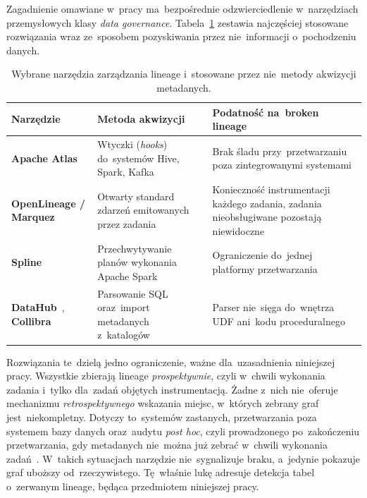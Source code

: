 \documentclass[polish,master,a4paper,oneside]{ppfcmthesis}
\renewcommand{\_}{\origtextunderscore\ifmmode\else\allowbreak\fi}
\begin{document}
Zagadnienie omawiane w~pracy ma~bezpośrednie odzwierciedlenie w~narzędziach
przemysłowych klasy \emph{data governance}. Tabela~\ref{tab:narzedzia}
zestawia najczęściej stosowane rozwiązania wraz ze~sposobem pozyskiwania
przez nie~informacji o~pochodzeniu danych.

\begin{table}[ht]
\centering
\caption[Wybrane narzędzia zarządzania lineage]{Wybrane narzędzia zarządzania lineage i~stosowane przez nie~metody
akwizycji metadanych.}
\label{tab:narzedzia}
\small
\begin{tabular}{@{}>{\raggedright\arraybackslash}p{3.6cm}
                >{\raggedright\arraybackslash}p{4.4cm}
                >{\raggedright\arraybackslash}p{4.6cm}@{}}
\toprule
\textbf{Narzędzie} & \textbf{Metoda akwizycji} & \textbf{Podatność
na~broken lineage} \\
\midrule
\textbf{Apache Atlas}~\cite{ApacheAtlas} &
  Wtyczki (\emph{hooks}) do~systemów Hive, Spark, Kafka &
  Brak śladu przy~przetwarzaniu poza zintegrowanymi systemami \\
\addlinespace[4pt]
\textbf{OpenLineage / Marquez}~\cite{OpenLineage} &
  Otwarty standard zdarzeń emitowanych przez zadania &
  Konieczność instrumentacji każdego zadania, zadania nieobsługiwane
  pozostają niewidoczne \\
\addlinespace[4pt]
\textbf{Spline}~\cite{Spline} &
  Przechwytywanie planów wykonania Apache Spark &
  Ograniczenie do~jednej platformy przetwarzania \\
\addlinespace[4pt]
\textbf{DataHub}~\cite{DataHub}, \textbf{Collibra}~\cite{Collibra} &
  Parsowanie SQL oraz~import metadanych z~katalogów &
  Parser nie~sięga do~wnętrza UDF ani~kodu proceduralnego \\
\bottomrule
\end{tabular}
\end{table}

Rozwiązania te~dzielą jedno ograniczenie, ważne dla~uzasadnienia niniejszej
pracy. Wszystkie zbierają lineage \emph{prospektywnie}, czyli w~chwili wykonania
zadania i~tylko dla~zadań objętych instrumentacją. Żadne z~nich nie~oferuje
mechanizmu \emph{retrospektywnego} wskazania miejsc, w~których zebrany graf
jest~niekompletny. Dotyczy to~systemów zastanych, przetwarzania poza systemem
bazy danych oraz~audytu \emph{post hoc}, czyli prowadzonego po~zakończeniu
przetwarzania, gdy metadanych nie~można już zebrać w~chwili wykonania
zadań~\cite{Brzeski2025}. W~takich sytuacjach narzędzie nie~sygnalizuje braku,
a~jedynie pokazuje graf uboższy od~rzeczywistego. Tę~właśnie lukę adresuje detekcja tabel o~zerwanym
lineage, będąca przedmiotem niniejszej pracy.
\end{document}
